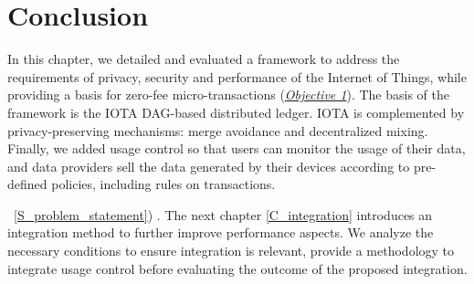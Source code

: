 \section{Conclusion}
\label{S_conclusion_ifip}

In this chapter, we detailed and evaluated a framework to address the requirements of privacy, security and
performance of the Internet of Things, while providing a basis for zero-fee micro-transactions (\hyperref[obj:1]{\emph{Objective 1}}). 
The basis of the framework is the IOTA DAG-based distributed ledger.
IOTA is complemented by privacy-preserving mechanisms: merge avoidance
and decentralized mixing. Finally, we added usage control so that users can monitor the usage of their data, 
and data providers sell the data generated by their devices according to pre-defined policies, including rules on transactions.

 \ref{S_problem_statement}) .
The next chapter \ref{C_integration} introduces an integration method to further improve performance aspects. 
We analyze the necessary conditions to ensure integration is relevant, provide a methodology to integrate usage control 
before evaluating the outcome of the proposed integration.
 